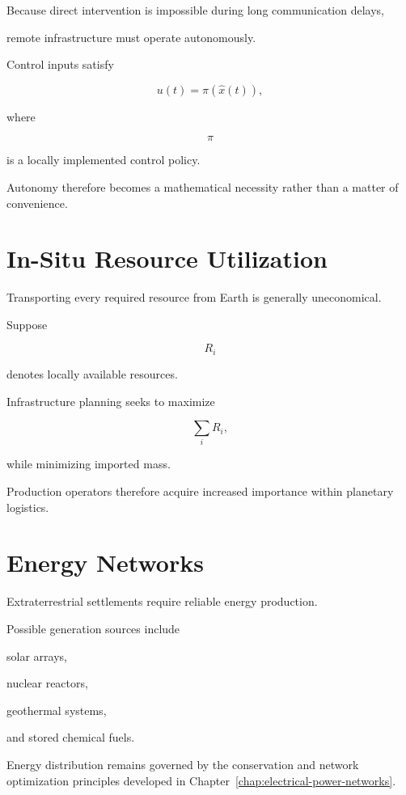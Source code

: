 \documentclass[11pt,fleqn]{book}
\numberwithin{equation}{chapter}
\theoremstyle{plain}
\theoremstyle{definition}
\theoremstyle{remark}
\begin{document}
Because direct intervention is impossible during long communication
delays,

remote infrastructure must operate autonomously.

Control inputs satisfy

\[
u(t)
=
\pi(\hat x(t)),
\]

where

\[
\pi
\]

is a locally implemented control policy.

Autonomy therefore becomes a mathematical necessity rather than a matter
of convenience.


\section{In-Situ Resource Utilization}

Transporting every required resource from Earth is generally
uneconomical.

Suppose

\[
R_i
\]

denotes locally available resources.

Infrastructure planning seeks to maximize

\[
\boxed{
\sum_i
R_i,
}
\]

while minimizing imported mass.

Production operators therefore acquire increased importance within
planetary logistics.


\section{Energy Networks}

Extraterrestrial settlements require reliable energy production.

Possible generation sources include

solar arrays,

nuclear reactors,

geothermal systems,

and stored chemical fuels.

Energy distribution remains governed by the conservation and network
optimization principles developed in Chapter~\ref{chap:electrical-power-networks}.

\end{document}
